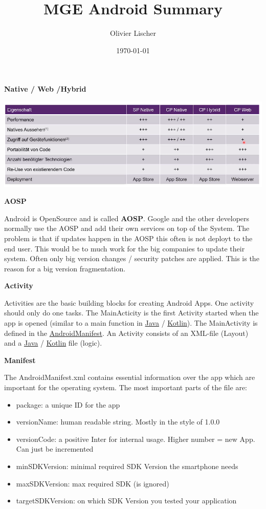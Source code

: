 \documentclass[11pt,twoside,landscape]{article}
\author{Olivier Lischer}
\date{\today}
\title{MGE Android Summary}
\begin{document}
\begin{multicols}{3}

\textbf{Native / Web /Hybrid}

\begin{center}
\includegraphics[width=.9\linewidth]{img/vor-nachteile-native-web-hybrid.png}
\end{center}

\textbf{AOSP}

Android is OpenSource and is called  \textbf{AOSP}.
Google and the other developers normally use the AOSP and add their own services on top of the System.
The problem is that if updates happen in the AOSP this often is not deployt to the end user.
This would be to much work for the big companies to update their system.
Often only big version changes / security patches are applied.
This is the reason for a big version fragmentation.

\textbf{Activity}

Activities are the basic building blocks for creating Android Apps.
One activity should only do one tasks.
The MainActicity is the first Activity started when the app is opened (similar to a main function in \href{../../../roam/20201116150053-java.org}{Java} / \href{../../../roam/20210921143046-kotlin.org}{Kotlin}).
The MainActivity is defined in the \href{../../../roam/20210921175054-androidmanifest.org}{AndroidManifest}.
An Activity consists of an XML-file (Layout) and a \href{../../../roam/20201116150053-java.org}{Java} / \href{../../../roam/20210921143046-kotlin.org}{Kotlin} file (logic). 

\textbf{Manifest}

The AndroidManifest.xml contains essential information over the app which are important for the operating system.
The most important parts of the file are:
\begin{itemize}
\item package: a unique ID for the app
\item versionName: human readable string. Mostly in the style of 1.0.0
\item versionCode: a positive Inter for internal usage. Higher number = new App. Can just be incremented
\item minSDKVersion: minimal required SDK Version the smartphone needs
\item maxSDKVersion: max required SDK (is ignored)
\item targetSDKVersion: on which SDK Version you tested your application
\end{itemize}


\end{multicols}
\end{document}
